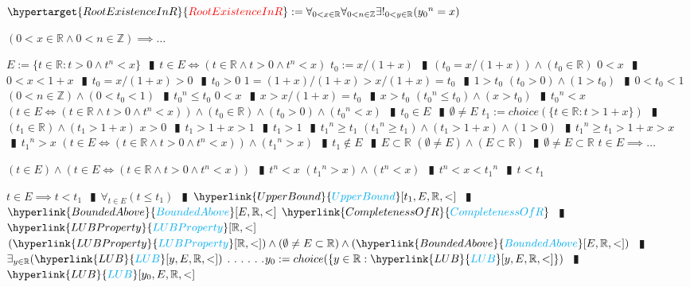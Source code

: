 \documentclass{book}
\newcommand{\df}[1]{\hypertarget{#1}{\textcolor{red}{#1}}}
\newcommand{\rf}[1]{\hyperlink{#1}{\textcolor{cyan}{#1}}}
\newcommand{\abr}{:=}
\newcommand{\cont}{\phantom{.}. . .\phantom{.}}
\newcommand{\pipe}{$\phantom{(}\vrectangleblack\phantom{)}$}
\begin{document}
$\df{RootExistenceInR} \abr \forall_{0 < x \in \mathbb{R}} \forall_{0 < n \in \mathbb{Z}} \exists!_{0 < y \in \mathbb{R}}({y_0}^n = x)$
\begin{enumerate}
  \lit $(0 < x \in \mathbb{R} \land 0 < n \in \mathbb{Z}) \implies \ldots$
  \begin{enumerate}
    \lit $E \abr \{t \in \mathbb{R} : t > 0 \land t^n < x\}$ \pipe $t \in E \iff (t \in \mathbb{R} \land t > 0 \land t^n < x)$
    \lit $t_0 \abr x / (1 + x)$ \pipe $(t_0 = x / (1 + x)) \land (t_0 \in \mathbb{R})$
    \lit $0 < x$ \pipe $0 < x < 1 + x$ \pipe $t_0 = x / (1 + x) > 0$ \pipe $t_0 > 0$
    \lit $1 = (1 + x) / (1 + x) > x / (1 + x) = t_0$ \pipe $1 > t_0$
    \lit $(t_0 > 0) \land (1 > t_0)$ \pipe $0 < t_0 < 1$
    \lit $(0 < n \in \mathbb{Z}) \land (0 < t_0 < 1)$ \pipe ${t_0}^n \leq t_0$
    \lit $0 < x$ \pipe $x > x / (1 + x) = t_0$ \pipe $x > t_0$
    \lit $({t_0}^n \leq t_0) \land (x > t_0)$ \pipe ${t_0}^n < x$
    \lit $(t \in E \iff (t \in \mathbb{R} \land t > 0 \land t^n < x)) \land (t_0 \in \mathbb{R}) \land (t_0 > 0) \land ({t_0}^n < x)$ \pipe $t_0 \in E$ \pipe $\emptyset \neq E$
    \lit $t_1 \abr choice(\{t \in \mathbb{R} : t > 1 + x\})$ \pipe $(t_1 \in \mathbb{R}) \land (t_1 > 1 + x)$
    \lit $x > 0$ \pipe $t_1 > 1 + x > 1$ \pipe $t_1 > 1$ \pipe ${t_1}^n \geq t_1$
    \lit $({t_1}^n \geq t_1) \land (t_1 > 1 + x) \land (1 > 0)$ \pipe ${t_1}^n \geq t_1 > 1 + x > x$ \pipe ${t_1}^n > x$
    \lit $(t \in E \iff (t \in \mathbb{R} \land t > 0 \land t^n < x)) \land ({t_1}^n > x)$ \pipe $t_1 \notin E$ \pipe $E \subset \mathbb{R}$
    \lit $(\emptyset \neq E) \land (E \subset \mathbb{R})$ \pipe $\emptyset \neq E \subset \mathbb{R}$
    \lit $t \in E \implies \ldots$
    \begin{enumerate}
      \lit $(t \in E) \land (t \in E \iff (t \in \mathbb{R} \land t > 0 \land t^n < x))$ \pipe $t^n < x$
      \lit $({t_1}^n > x) \land (t^n < x)$ \pipe $t^n < x < {t_1}^n$ \pipe $t < t_1$
    \end{enumerate}
    \lit $t \in E \implies t < t_1$ \pipe $\forall_{t \in E}(t \leq t_1)$ \pipe $\rf{UpperBound}[t_1, E, \mathbb{R}, <]$ \pipe $\rf{BoundedAbove}[E, \mathbb{R}, <]$
    \lit $\rf{CompletenessOfR}$ \pipe $\rf{LUBProperty}[\mathbb{R}, <]$
    \lit $(\rf{LUBProperty}[\mathbb{R}, <]) \land (\emptyset \neq E \subset \mathbb{R}) \land (\rf{BoundedAbove}[E, \mathbb{R}, <])$ \pipe $\exists_{y \in \mathbb{R}}(\rf{LUB}[y, E, \mathbb{R}, <])$ \cont
    \lit \cont $y_0 \abr choice(\{y \in \mathbb{R} : \rf{LUB}[y, E, \mathbb{R}, <]\})$ \pipe $\rf{LUB}[y_0, E, \mathbb{R}, <]$

\end{enumerate}
\end{enumerate}
\end{document}
